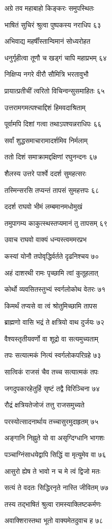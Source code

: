 अग्रे तव महाबाहो किङ्करः समुपस्थितः

भाषितं सुचिरं श्रुत्वा पुष्पकस्य नराधिप ६३

अभिवाद्य महर्षींस्तान्विमानं सोध्यरोहत

धनुर्गृहीत्वा तूणौ च खड्गं चापि महाप्रभम् ६४

निक्षिप्य नगरे वीरौ सौमित्रि भरतावुभौ

प्रायात्प्रतीचीं त्वरितो विचिन्वन्सुसमाहितः ६५

उत्तरामगमत्पश्चाद्दिशं हिमवदाश्रिताम्

पूर्वामपि दिशां गत्वा तथाऽपश्यन्नराधिपः ६६

सर्वां शुद्धसमाचारामादर्शमिव निर्मलाम्

ततो दिशं समाक्रामद्दक्षिणां रघुनन्दनः ६७

शैलस्य उत्तरे पार्श्वे ददर्श सुमहत्सरः

तस्मिन्सरसि तप्यन्तं तापसं सुमहत्तपः ६८

ददर्श राघवो भीमं लम्बमानमधोमुखं

तमुपागम्य काकुत्स्थस्तप्यमानं तु तापसम् ६९

उवाच राघवो वाक्यं धन्यस्त्वममरप्रभ

कस्यां योनौ तपोवृद्धिर्वर्तते दृढनिश्चय ७०

अहं दाशरथी रामः पृच्छामि त्वां कुतूहलात्

कोर्थो व्यवसितस्तुभ्यं स्वर्गलोकोथ वेतरः ७१

किमर्थं तप्यसे वा त्वं श्रोतुमिच्छामि तापस

ब्राह्मणो वासि भद्रं ते क्षत्रियो वाथ दुर्जयः ७२

वैश्यस्तृतीयवर्णो वा शूद्रो वा सत्यमुच्यताम्

तपः सत्यात्मकं नित्यं स्वर्गलोकपरिग्रहे ७३

सात्विकं राजसं चैव तच्च सत्यात्मकं तपः

जगदुपकारहेतुर्हि सृष्टं तद्वै विरिञ्चिना ७४

रौद्रं क्षत्रियतेजोजं तत्तु राजसमुच्यते

परस्योत्सादनार्थाय तच्चासुरमुदाहृतम् ७५

अङ्गानि निह्नुते यो वा असृग्दिग्धानि भागशः

पञ्चाग्निंसाधयेद्वापि सिद्धिं वा मृत्युमेव वा ७६

आसुरो ह्येष ते भावो न च मे त्वं द्विजो मतः

सत्यं ते वदतः सिद्धिरनृते नास्ति जीवितम् ७७

तस्य तद्भाषितं श्रुत्वा रामस्याक्लिष्टकर्मणः

अवाक्शिरास्तथा भूतो वाक्यमेतदुवाच ह ७८

